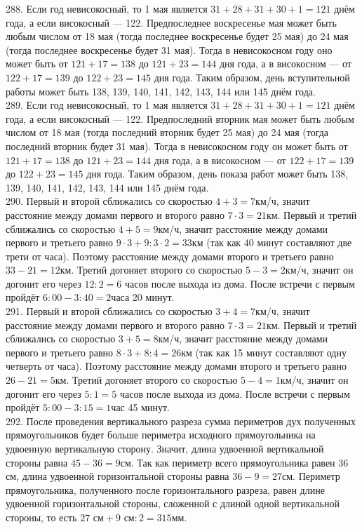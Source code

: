 \documentclass[12pt]{article}
\begin{document}
288. Если год невисокосный, то 1 мая является $31+28+31+30+1=121$ днём года, а если високосный --- 122. Предпоследнее воскресенье мая может быть любым числом от 18 мая (тогда последнее воскресенье будет 25 мая) до 24 мая (тогда последнее воскресенье будет 31 мая). Тогда в невисокосном году оно может быть от $121+17=138$ до $121+23=144$ дня года, а в високосном --- от $122+17=139$ до $122+23=145$ дня года. Таким образом, день вступительной работы может быть 138, 139, 140, 141, 142, 143, 144 или 145 днём года.\\
289. Если год невисокосный, то 1 мая является $31+28+31+30+1=121$ днём года, а если високосный --- 122. Предпоследний вторник мая может быть любым числом от 18 мая (тогда последний вторник будет 25 мая) до 24 мая (тогда последний вторник будет 31 мая). Тогда в невисокосном году он может быть от $121+17=138$ до $121+23=144$ дня года, а в високосном --- от $122+17=139$ до $122+23=145$ дня года. Таким образом, день показа работ может быть 138, 139, 140, 141, 142, 143, 144 или 145 днём года.\\
290. Первый и второй сближались со скоростью $4+3=7$км/ч, значит расстояние между домами первого и второго равно $7\cdot3=21$км. Первый и третий сближались со скоростью $4+5=9$км/ч, значит расстояние между домами первого и третьего равно $9\cdot3+9:3\cdot2=33$км (так как 40 минут составляют две трети от часа). Поэтому расстояние между домами второго и третьего равно $33-21=12$км. Третий догоняет второго со скоростью $5-3=2$км/ч, значит он догонит его через $12:2=6$ часов после выхода из дома. После встречи с первым пройдёт $6:00-3:40=2$часа 20 минут.\\
291. Первый и второй сближались со скоростью $3+4=7$км/ч, значит расстояние между домами первого и второго равно $7\cdot3=21$км. Первый и третий сближались со скоростью $3+5=8$км/ч, значит расстояние между домами первого и третьего равно $8\cdot3+8:4=26$км (так как 15 минут составляют одну четверть от часа). Поэтому расстояние между домами второго и третьего равно $26-21=5$км. Третий догоняет второго со скоростью $5-4=1$км/ч, значит он догонит его через $5:1=5$ часов после выхода из дома. После встречи с первым пройдёт $5:00-3:15=1$час 45 минут.\\
292. После проведения вертикального разреза сумма периметров дух полученных прямоугольников будет больше периметра исходного прямоугольника на удвоенную вертикальную сторону. Значит, длина удвоенной вертикальной стороны равна $45-36=9$см. Так как периметр всего прямоугольника равен 36 см, длина удвоенной горизонтальной стороны равна $36-9=27$см. Периметр прямоугольника, полученного после горизонтального разреза, равен длине удвоенной горизонтальной стороны, сложенной с длиной одной вертикальной стороны, то есть $27\text{ см}+9\text{ см}:2=315$мм.\\
\end{document}
